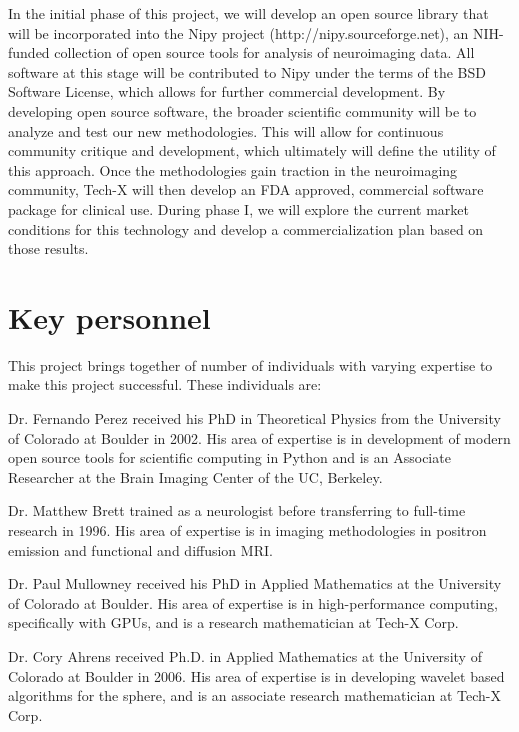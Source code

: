 \documentclass[10pt]{article}
\begin{document}
In the initial phase of this project, we will develop an open source library
that will be incorporated into the Nipy project (http://nipy.sourceforge.net),
an NIH-funded collection of open source tools for analysis of neuroimaging data.
All software at this stage will be contributed to Nipy under the terms of the
BSD Software License, which allows for further commercial development. By developing
open source software, the broader scientific community will be to analyze and test
our new methodologies. This will allow for continuous community critique and 
development, which ultimately will define the utility of this approach. Once the
methodologies gain traction in the neuroimaging community, Tech-X will then develop
an FDA approved, commercial software package for clinical use. During phase I, we will
explore the current market conditions for this technology and develop a commercialization
plan based on those results.

\vspace{-8pt}
\section*{Key personnel}
\vspace{-5pt}
This project brings together of number of individuals with varying expertise to make this project successful. These individuals are:
\begin{itemize*}
  \item{Dr. Fernando Perez received his PhD in Theoretical Physics from the University of Colorado at Boulder in 2002. His area of expertise is in development of modern open source tools for scientific computing in Python and is an Associate Researcher at the Brain Imaging Center of the UC, Berkeley.}

  \item{Dr. Matthew Brett trained as a neurologist before transferring to full-time research in 1996. His area of expertise is in imaging methodologies in positron emission and functional and diffusion MRI.}
  
  \item{Dr. Paul Mullowney received his PhD in Applied Mathematics at the University of Colorado at Boulder. His area of expertise is in high-performance computing, specifically with GPUs, and is a research mathematician at Tech-X Corp.}

  \item{Dr. Cory Ahrens received Ph.D. in Applied Mathematics at the University of Colorado at Boulder in 2006. His area of expertise is in developing wavelet based algorithms for the sphere, and is an associate research mathematician at Tech-X Corp.}
  
\end{itemize*}



\end{document}
